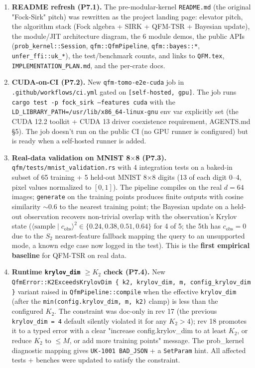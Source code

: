 \documentclass[11pt, a4paper]{article}
\begin{document}
\begin{enumerate}
\item \textbf{README refresh (P7.1).} The pre-modular-kernel
  \texttt{README.md} (the original "Fock-Sirk" pitch) was rewritten
  as the project landing page: elevator pitch, the algorithm
  stack (Fock algebra + SIRK + QFM-TSR + Bayesian update), the
  module/JIT architecture diagram, the 6 module demos, the
  public APIs (\texttt{prob\_kernel::Session},
  \texttt{qfm::QfmPipeline}, \texttt{qfm::bayes::*},
  \texttt{unfer\_ffi::uk\_*}), the test/benchmark counts, and
  links to \texttt{QFM.tex}, \texttt{IMPLEMENTATION\_PLAN.md},
  and the per-crate docs.

\item \textbf{CUDA-on-CI (P7.2).} New \texttt{qfm-tomo-e2e-cuda}
  job in \texttt{.github/workflows/ci.yml} gated on
  \texttt{[self-hosted, gpu]}. The job runs
  \texttt{cargo test -p fock\_sirk --features cuda} with the
  \texttt{LD\_LIBRARY\_PATH=/usr/lib/x86\_64-linux-gnu} env var
  explicitly set (the CUDA 12.2 toolkit + CUDA 13 driver
  coexistence requirement, AGENTS.md \S5). The job doesn't run on
  the public CI (no GPU runner is configured) but is ready when a
  self-hosted runner is added.

\item \textbf{Real-data validation on MNIST 8$\times$8 (P7.3).}
  \texttt{qfm/tests/mnist\_validation.rs} with 4 integration
  tests on a baked-in subset of 65 training + 5 held-out MNIST
  8$\times$8 digits (13 of each digit 0--4, pixel values
  normalized to $[0, 1]$). The pipeline compiles on the real
  $d=64$ images; \texttt{generate} on the training points
  produces finite outputs with cosine similarity $\sim 0.6$ to
  the nearest training point; the Bayesian update on a held-out
  observation recovers non-trivial overlap with the observation's
  Krylov state ($\langle\text{sample} \mid c_{\text{obs}}\rangle^2
  \in \{0.24, 0.38, 0.51, 0.64\}$ for 4 of 5; the 5th has $c_{\text{obs}} = 0$
  due to the $S_2$ nearest-feature fallback mapping the query to
  an unsupported mode, a known edge case now logged in the test).
  This is the \textbf{first empirical baseline} for QFM-TSR on
  real data.

\item \textbf{Runtime \texttt{krylov\_dim} $\ge K_2$ check (P7.4).}
  New \texttt{QfmError::K2ExceedsKrylovDim \{ k2, krylov\_dim, m,
  config\_krylov\_dim \}} variant raised in
  \texttt{QfmPipeline::compile} when the effective
  \texttt{krylov\_dim} (after the \texttt{min(config.krylov\_dim, m,
  k2)} clamp) is less than the configured $K_2$. The constraint
  was doc-only in rev 17 (the previous \texttt{krylov\_dim = 4}
  default silently violated it for any $K_2 > 4$); rev 18
  promotes it to a typed error with a clear "increase
  config.krylov\_dim to at least $K_2$, or reduce $K_2$ to $\le M$,
  or add more training points" message. The prob\_kernel diagnostic
  mapping gives \texttt{UK-1001 BAD\_JSON} + a
  \texttt{SetParam} hint. All affected tests + benches were
  updated to satisfy the constraint.


\end{enumerate}
\end{document}
